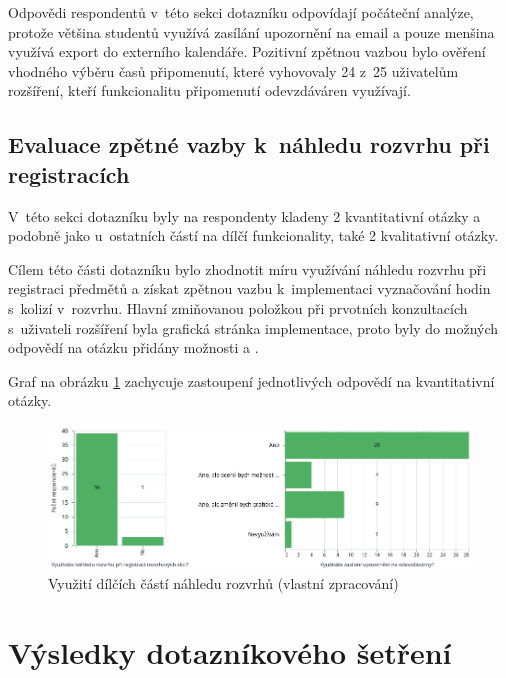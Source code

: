 Odpovědi respondentů v~této sekci dotazníku odpovídají počáteční analýze, protože většina studentů využívá zasílání upozornění na email a pouze menšina využívá export do externího kalendáře. Pozitivní zpětnou vazbou bylo ověření vhodného výběru časů připomenutí, které vyhovovaly 24 z~25 uživatelům rozšíření, kteří funkcionalitu připomenutí odevzdáváren využívají.

\subsection{Evaluace zpětné vazby k~náhledu rozvrhu při registracích}

V~této sekci dotazníku byly na respondenty kladeny 2 kvantitativní otázky a podobně jako u~ostatních částí na dílčí funkcionality, také 2 kvalitativní otázky.

Cílem této části dotazníku bylo zhodnotit míru využívání náhledu rozvrhu při registraci předmětů a získat zpětnou vazbu k~implementaci vyznačování hodin s~kolizí v~rozvrhu. Hlavní zmiňovanou položkou při prvotních konzultacích s~uživateli rozšíření byla grafická stránka implementace, proto byly do možných odpovědí na otázku  přidány možnosti  a .    

Graf na obrázku \ref{fig:nahledy-vizualizace} zachycuje zastoupení jednotlivých odpovědí na kvantitativní otázky.

\begin{figure}[htbp!]\centering
    \includegraphics[width=\textwidth]{img/preview-visualization.png}
    \caption{Využití dílčích částí náhledu rozvrhů (vlastní zpracování)}
    \label{fig:nahledy-vizualizace}
\end{figure}

\section{Výsledky dotazníkového šetření}


